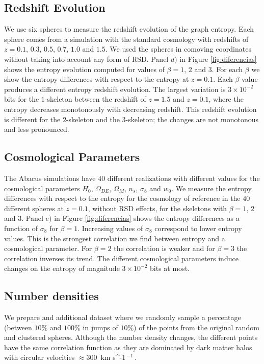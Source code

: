\documentclass[fleqn,usenatbib]{mnras}
\newcommand{\kms}{\,{\rm km s}\ifmmode ^{-1}\,\else $^{-1}$\,\fi}
\begin{document}
\subsection{Redshift Evolution}
We use six spheres to measure the redshift evolution of the graph entropy. 
Each sphere comes from a simulation with the standard cosmology with redshifts of
$z=0.1$, $0.3$, $0.5$, $0.7$, $1.0$ and $1.5$. 
We used the spheres in comoving coordinates without taking into account any form of RSD.
Panel $d)$ in Figure \ref{fig:diferencias} shows the entropy evolution computed for values
of $\beta=1$, $2$ and $3$.
For each $\beta$ we show the entropy differences with respect to the entropy at $z=0.1$.
Each $\beta$ value produces a different entropy redshift evolution.
The largest variation is $3\times 10^{-2}$ bits for the $1$-skeleton between the redshift of
$z=1.5$ and $z=0.1$, where the entropy decreases monotonously with decreasing redshift.
This redshift evolution is different for the $2$-skeleton and the $3$-skeleton; the changes 
are not monotonous and less pronounced.

\subsection{Cosmological Parameters}
The Abacus simulations have $40$ different realizations with different values for the
cosmological  parameters $H_0$, $\Omega_{DE}$, $\Omega_{M}$, $n_s$, $\sigma_8$ and $w_0$.
We measure the entropy differences with respect to the entropy for the cosmology of 
reference in the $40$ different spheres at $z=0.1$, without RSD effects, 
for the skeletons with $\beta=1$, $2$ and $3$.
Panel $e)$ in Figure \ref{fig:diferencias} 
shows the entropy differences as a function of $\sigma_8$ for $\beta=1$.
Increasing values of $\sigma_8$ correspond to lower entropy values. 
This is the strongest correlation we find between entropy and a cosmological parameter.
For $\beta=2$ the correlation is weaker and for $\beta=3$ the correlation inverses its
trend.
The different cosmological parameters induce changes on the entropy of magnitude $3\times10^{-2}$ bits at most.

\subsection{Number densities}

We prepare and additional dataset where we randomly 
sample a percentage (between $10\%$ and $100\%$ in jumps of $10\%$) 
of the points from the original random and clustered spheres.
Although the number density changes, the different points have the 
same correlation function as they are dominated by dark matter halos with circular velocities $\approx 300$ \kms.
\end{document}
